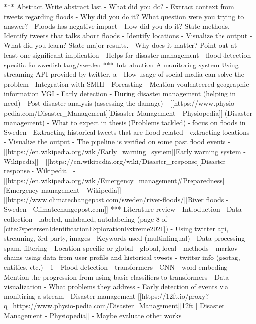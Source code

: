 \documentclass[a4paper, 12pt]{article}
\begin{document}
 \begingroup\makeatletter{}
\verbatim
*** Abstract
Write abstract last
- What did you do?
  - Extract context from tweets regarding floods
- Why did you do it? What question were you trying to answer?
  - Floods has negative impact
- How did you do it? State methods.
  - Identify tweets that talks about floods
  - Identify locations
  - Visualize the output
- What did you learn? State major results.
- Why does it matter? Point out at least one significant implication
  - Helps for disaster management
  - flood detection specific for swedish lang/sweden
*** Introduction
A monitoring system Using streaming API provided by twitter, a
- How usage of social media can solve the problem
  - Integration with SMHI
  - Forcasting
  - Mention voulenteered geographic information VGI
  - Early detection
  - During disaster management (helping in need)
  - Post disaster analysis (assessing the damage)
  - [[https://www.physio-pedia.com/Disaster_Management][Disaster Management - Physiopedia]] (Disaster management)
- What to expect in thesis (Problems tackled)
  - focus on floods in Sweden
  - Extracting historical tweets that are flood related
  - extracting locations
  - Visualize the output
  - The pipeline is verified on some past flood events
- [[https://en.wikipedia.org/wiki/Early_warning_system][Early warning system - Wikipedia]]
- [[https://en.wikipedia.org/wiki/Disaster_response][Disaster response - Wikipedia]]
- [[https://en.wikipedia.org/wiki/Emergency_management#Preparedness][Emergency management - Wikipedia]]
- [[https://www.climatechangepost.com/sweden/river-floods/][River floods - Sweden - Climatechangepost.com]]
*** Literature review
- Introduction
- Data collection
  - labeled, unlabaled, autolabeling (page 8 of [cite:@petersenIdentificationExplorationExtreme2021])
  - Using twitter api, streaming, 3rd party, images
  - Keywords used (multinlingual)
  - Data processing
    - spam, filtering
- Location specific or global
  - global, local
  - methods
    - markov chains using data from user profile and historical tweets
  - twitter info (geotag, entities, etc.)
  - 1%
- Flood detection
  - transformers
  - CNN
  - word embeding
  - Mention the progression from using basic classifiers to transformers
- Data visualization
- What problems they address
  - Early detection of events via monitiring a stream
  - Disaster management [[https://12ft.io/proxy?q=https://www.physio-pedia.com/Disaster_Management][12ft | Disaster Management - Physiopedia]]
- Maybe evaluate other works
\end{document}
